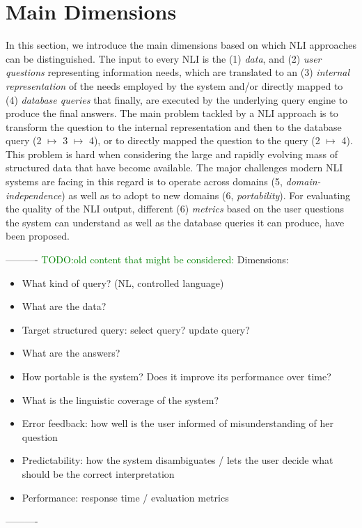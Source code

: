 \documentclass[10pt,journal,letterpaper,compsoc]{IEEEtran}
\newcommand{\TODO}[1]{{\textcolor{green}{TODO:#1}}}
\begin{document}
\section{Main Dimensions}
In this section, we introduce the main dimensions based on which NLI approaches can be distinguished. The input to every NLI is the (1) \emph{data}, 
and (2) \emph{user questions} representing information needs, which are translated to an (3) \emph{internal representation} of the needs employed by the system and/or directly mapped to 
(4) \emph{database queries} that finally, are executed by the underlying query engine to produce the final answers. The main problem tackled by a NLI approach is to transform the question to the internal representation and then to the database query (2 $\mapsto$ 3 $\mapsto$ 4), or to directly mapped the question to the query (2 $\mapsto$ 4). This problem is hard when considering the large and rapidly evolving mass of structured data that have become available. The major challenges modern NLI systems are facing in this regard is to operate across domains (5, \emph{domain-independence}) as well as to adopt to new domains (6, \emph{portability}). For evaluating the quality of the NLI output, different (6) \emph{metrics} based on the user questions the system can understand as well as the database queries it can produce, have been proposed. 

----------
\TODO{old content that might be considered:}
Dimensions:
\begin{itemize}
  \item What kind of query? (NL, controlled language)
  \item What are the data? 
  \item Target structured query: select query? update query?
  \item What are the answers?
  \item How portable is the system? Does it improve its performance over time?
  \item What is the linguistic coverage of the system? 
  \item Error feedback: how well is the user informed of misunderstanding of her
  question
  \item Predictability: how the system disambiguates / lets the user decide what
  should be the correct interpretation
  \item Performance: response time / evaluation metrics
\end{itemize}

----------
\end{document}

